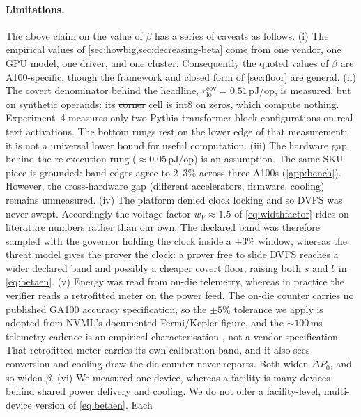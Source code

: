 \documentclass{article}
\makeatletter
\theoremstyle{plain}
\theoremstyle{definition}
\theoremstyle{remark}
\providecommand{\DIFaddtex}[1]{{\protect\color{blue}\uwave{#1}}} %
\providecommand{\DIFdeltex}[1]{{\protect\color{red}\sout{#1}}} %
\providecommand{\DIFaddbegin}{} %
\providecommand{\DIFaddend}{} %
\providecommand{\DIFdelbegin}{} %
\providecommand{\DIFdelend}{} %
\providecommand{\DIFadd}[1]{\texorpdfstring{\DIFaddtex{#1}}{#1}} %
\providecommand{\DIFdel}[1]{\texorpdfstring{\DIFdeltex{#1}}{}} %
\providecommand{\DIFscaledelfig}{0.5}
\newlength{\DIFdelgraphicswidth} %
\newlength{\DIFdelgraphicsheight} %
\providecommand{\DIFaddincludegraphics}[2][]{{\color{blue}\fbox{\DIFOincludegraphics[#1]{#2}}}} %
\providecommand{\DIFdelincludegraphics}[2][]{%
\sbox{\DIFdelgraphicsbox}{\DIFOincludegraphics[#1]{#2}}%
\settoboxwidth{\DIFdelgraphicswidth}{\DIFdelgraphicsbox} %
\settoboxtotalheight{\DIFdelgraphicsheight}{\DIFdelgraphicsbox} %
\scalebox{\DIFscaledelfig}{%
\parbox[b]{\DIFdelgraphicswidth}{\usebox{\DIFdelgraphicsbox}\\[-\baselineskip] \rule{\DIFdelgraphicswidth}{0em}}\llap{\resizebox{\DIFdelgraphicswidth}{\DIFdelgraphicsheight}{%
\setlength{\unitlength}{\DIFdelgraphicswidth}%
\begin{picture}(1,1)%
\thicklines\linethickness{2pt} %
{\color[rgb]{1,0,0}\put(0,0){\framebox(1,1){}}}%
{\color[rgb]{1,0,0}\put(0,0){\line( 1,1){1}}}%
{\color[rgb]{1,0,0}\put(0,1){\line(1,-1){1}}}%
\end{picture}%
}\hspace*{3pt}}} %
} %
\DeclareRobustCommand{\DIFaddbegin}{\DIFOaddbegin \let\includegraphics\DIFaddincludegraphics} %
\DeclareRobustCommand{\DIFaddend}{\DIFOaddend \let\includegraphics\DIFOincludegraphics} %
\DeclareRobustCommand{\DIFdelbegin}{\DIFOdelbegin \let\includegraphics\DIFdelincludegraphics} %
\DeclareRobustCommand{\DIFdelend}{\DIFOaddend \let\includegraphics\DIFOincludegraphics} %
\let\sout@orig\sout %
\renewcommand{\sout}[1]{\ifmmode\text{\sout@orig{\ensuremath{#1}}}\else\sout@orig{#1}\fi} %
\makeatother
\begin{document}
\paragraph{Limitations.}
The above claim on the value of $\beta$ has a series of caveats as follows. (i) The empirical values of \cref{sec:howbig,sec:decreasing-beta} come from one vendor, one
GPU model, one driver, and one cluster. Consequently the quoted values of $\beta$ are
A100-specific, though the framework and closed form of \cref{sec:floor} are general.
(ii) The covert denominator behind the headline,
$r_{\mathrm{lo}}^{\mathrm{cov}} = 0.51$\,pJ/op, is measured, but on synthetic
operands: its \DIFdelbegin \DIFdel{corner }\DIFdelend \DIFaddbegin \DIFadd{cheapest }\DIFaddend cell is int8 on zeros, which compute nothing.
Experiment~4 measures only two Pythia transformer-block configurations on real
text activations. The bottom rungs rest on the lower edge of that measurement;
it is not a universal lower bound for useful computation. (iii) The hardware gap behind the
re-execution rung (${\approx}0.05$\,pJ/op) is an assumption. The same-SKU
piece is grounded: band edges agree to $2$--$3\%$ across three A100s
(\cref{app:bench}). However, the cross-hardware gap (different
accelerators, firmware, cooling) remains unmeasured. (iv) The platform denied clock locking and so DVFS was never
swept. Accordingly the voltage factor $w_V \approx 1.5$ of
\cref{eq:widthfactor} rides on literature numbers rather than our own. The
declared band was therefore sampled with the governor
holding the clock inside a $\pm 3\%$ window, whereas the threat model gives
the prover the clock: a prover free to slide DVFS reaches a wider declared
band and possibly a cheaper covert floor, raising both $s$ and $b$ in
\cref{eq:betaen}. (v) Energy was read from on-die telemetry, whereas in
practice the verifier reads a retrofitted meter on the power feed. The on-die
counter carries no published GA100 accuracy specification, so the $\pm 5\%$
tolerance we apply is adopted from NVML's documented Fermi/Kepler figure, and
the ${\sim}100$\,ms \DIFaddbegin \DIFadd{power-}\DIFaddend telemetry cadence is an empirical characterisation
\citep{yang2023parttime}, not a vendor specification. That retrofitted meter
carries its own calibration band, and it also sees conversion and cooling draw
the die counter never reports. Both widen $\Delta P_0$, and so widen $\beta$. (vi) We measured one device, whereas a facility is
many devices behind shared power delivery and cooling. We do not offer a
facility-level, multi-device version of \cref{eq:betaen}. Each
\end{document}

